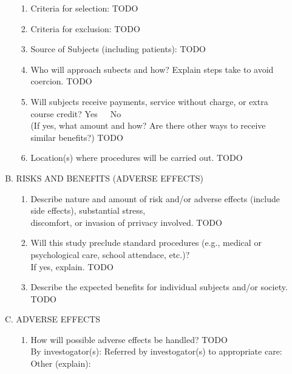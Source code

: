 \documentclass{article}
\newcommand{\response}[1]{{\color{blue}#1}}
\newcommand{\yn}{{Yes~~~No\\ }}
\begin{document}
\begin{enumerate}[I.]
\begin{enumerate}[A.]
\begin{enumerate}[1.]
            \item Criteria for selection: \response{TODO} \\

            \item Criteria for exclusion: \response{TODO} \\

            \item Source of Subjects (including patients): \response{TODO} \\

            \item Who will approach subects and how? Explain steps take to avoid coercion. \response{TODO} \\

            \item Will subjects receive payments, service without charge, or
                extra course credit? \yn
            (If yes, what amount and how? Are there other ways to receive similar benefits?) \response{TODO} \\

            \item Location(s) where procedures will be carried out. \response{TODO} \\
        \end{enumerate}

        \item RISKS AND BENEFITS (ADVERSE EFFECTS)
        \begin{enumerate}[1.]
            \item Describe nature and amount of risk and/or adverse effects (include side effects), substantial stress,\\
            discomfort, or invasion of prrivacy involved. \response{TODO} \\

            \item Will this study preclude standard procedures (e.g., medical or psychological care, school attendace, etc.)?\\
            If yes, explain. \response{TODO} \\

            \item Describe the expected benefits for individual subjects and/or society. \response{TODO} \\

        \end{enumerate}
        \item ADVERSE EFFECTS
        \begin{enumerate}[1.]
            \item How will possible adverse effects be handled? \response{TODO} \\
            By investogator(s):
            Referred by investogator(s) to appropriate care:
            Other (explain):\\


\end{enumerate}
\end{enumerate}
\end{enumerate}
\end{document}
